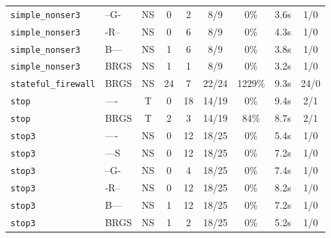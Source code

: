 \begin{tabular}{llccccccc}
\texttt{simple_nonser3} & --G- & NS & 0 & 2 & 8/9 & 0\% & 3.6s & 1/0 \\
\texttt{simple_nonser3} & -R-- & NS & 0 & 6 & 8/9 & 0\% & 4.3s & 1/0 \\
\texttt{simple_nonser3} & B--- & NS & 1 & 6 & 8/9 & 0\% & 3.8s & 1/0 \\
\texttt{simple_nonser3} & BRGS & NS & 1 & 1 & 8/9 & 0\% & 3.2s & 1/0 \\
\texttt{stateful_firewall} & BRGS & NS & 24 & 7 & 22/24 & 1229\% & 9.3s & 24/0 \\
\texttt{stop} & ---- & T & 0 & 18 & 14/19 & 0\% & 9.4s & 2/1 \\
\texttt{stop} & BRGS & T & 2 & 3 & 14/19 & 84\% & 8.7s & 2/1 \\
\texttt{stop3} & ---- & NS & 0 & 12 & 18/25 & 0\% & 5.4s & 1/0 \\
\texttt{stop3} & ---S & NS & 0 & 12 & 18/25 & 0\% & 7.2s & 1/0 \\
\texttt{stop3} & --G- & NS & 0 & 4 & 18/25 & 0\% & 7.4s & 1/0 \\
\texttt{stop3} & -R-- & NS & 0 & 12 & 18/25 & 0\% & 8.2s & 1/0 \\
\texttt{stop3} & B--- & NS & 1 & 12 & 18/25 & 0\% & 7.2s & 1/0 \\
\texttt{stop3} & BRGS & NS & 1 & 2 & 18/25 & 0\% & 5.2s & 1/0 \\
\bottomrule
\end{tabular}

